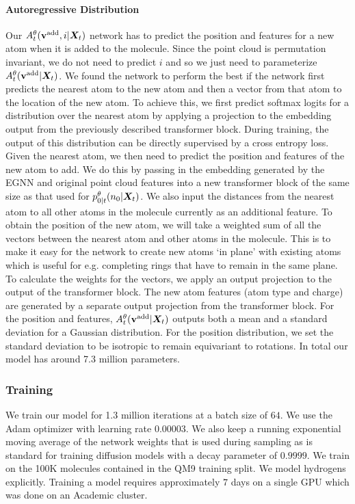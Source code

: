 \paragraph{Autoregressive Distribution}
Our $A_t^\theta({\mathbf{v}}^{\textup{add}}, i | {\bm{X}}_t)$ network has to predict the position and features for a new atom when it is added to the molecule. Since the point cloud is permutation invariant, we do not need to predict $i$ and so we just need to parameterize $A_t^\theta({\mathbf{v}}^{\textup{add}} | {\bm{X}}_t)$. We found the network to perform the best if the network first predicts the nearest atom to the new atom and then a vector from that atom to the location of the new atom. To achieve this, we first predict softmax logits for a distribution over the nearest atom by applying a projection to the embedding output from the previously described transformer block. During training, the output of this distribution can be directly supervised by a cross entropy loss. Given the nearest atom, we then need to predict the position and features of the new atom to add. We do this by passing in the embedding generated by the EGNN and original point cloud features into a new transformer block of the same size as that used for $p_{0|t}^\theta(n_0 | {\bm{X}}_t)$. We also input the distances from the nearest atom to all other atoms in the molecule currently as an additional feature. To obtain the position of the new atom, we will take a weighted sum of all the vectors between the nearest atom and other atoms in the molecule. This is to make it easy for the network to create new atoms `in plane' with existing atoms which is useful for e.g. completing rings that have to remain in the same plane. To calculate the weights for the vectors, we apply an output projection to the output of the transformer block. The new atom features (atom type and charge) are generated by a separate output projection from the transformer block. For the position and features, $A_t^\theta({\mathbf{v}}^{\textup{add}} | {\bm{X}}_t)$ outputs both a mean and a standard deviation for a Gaussian distribution. For the position distribution, we set the standard deviation to be isotropic to remain equivariant to rotations. In total our model has around 7.3 million parameters.

\subsubsection{Training}
We train our model for 1.3 million iterations at a batch size of $64$. We use the Adam optimizer with learning rate $0.00003$. We also keep a running exponential moving average of the network weights that is used during sampling as is standard for training diffusion models \cite{ho2020denoising, song2020score, karras2022elucidating} with a decay parameter of $0.9999$. We train on the 100K molecules contained in the QM9 training split. We model hydrogens explicitly. Training a model requires approximately $7$ days on a single GPU which was done on an Academic cluster.

